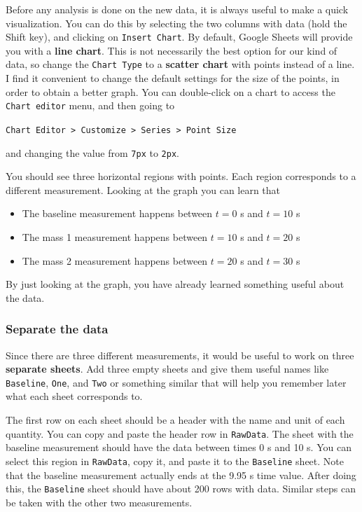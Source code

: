 Before any analysis is done on the new data, it is always useful to make a quick visualization. You can do this by selecting the two columns with data (hold the Shift key), and clicking on \texttt{Insert Chart}. By default, Google Sheets will provide you with a \textbf{line chart}. This is not necessarily the best option for our kind of data, so change the \texttt{Chart Type} to a \textbf{scatter chart} with points instead of a line. I find it convenient to change the default settings for the size of the points, in order to obtain a better graph. You can double-click on a chart to access the \texttt{Chart editor} menu, and then going to
\begin{center}
    \texttt{Chart Editor > Customize > Series > Point Size}
\end{center}
and changing the value from \texttt{7px} to \texttt{2px}.

You should see three horizontal regions with points. Each region corresponds to a different measurement. Looking at the graph you can learn that
\begin{itemize}
    \item The baseline measurement happens between $t = 0$ s and $t = 10$ s
    \item The mass 1 measurement happens between $t = 10$ s and $t = 20$ s
    \item The mass 2 measurement happens between $t = 20$ s and $t = 30$ s
\end{itemize}
By just looking at the graph, you have already learned something useful about the data.
\subsubsection{Separate the data}
Since there are three different measurements, it would be useful to work on three \textbf{separate sheets}. Add three empty sheets and give them useful names like \texttt{Baseline}, \texttt{One}, and \texttt{Two} or something similar that will help you remember later what each sheet corresponds to.

The first row on each sheet should be a header with the name and unit of each quantity. You can copy and paste the header row in \texttt{RawData}. The sheet with the baseline measurement should have the data between times 0 s and 10 s. You can select this region in \texttt{RawData}, copy it, and paste it to the \texttt{Baseline} sheet. Note that the baseline measurement actually ends at the 9.95 s time value. After doing this, the \texttt{Baseline} sheet should have about 200 rows with data. Similar steps can be taken with the other two measurements.
